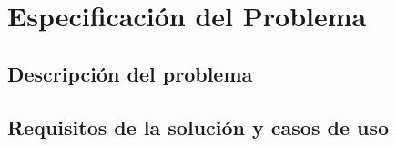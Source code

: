 \chapter{Especificación del Problema}


\section{Descripción del problema}



\section{Requisitos de la solución y casos de uso}